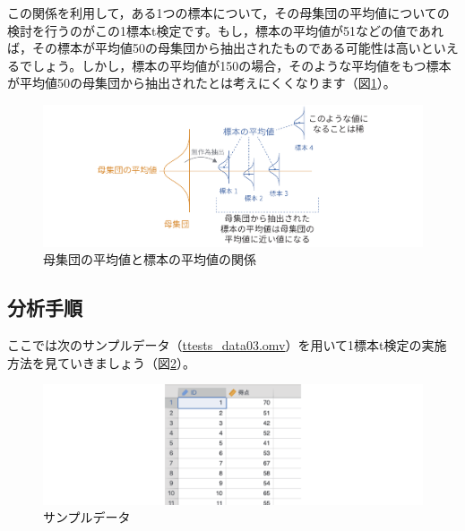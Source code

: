 \documentclass[
  12pt,
  a5jpaper,
  lualatex, ja=standard]{bxjsbook}
\begin{document}
この関係を利用して，ある1つの標本について，その母集団の平均値についての検討を行うのがこの1標本t検定です。もし，標本の平均値が51などの値であれば，その標本が平均値50の母集団から抽出されたものである可能性は高いといえるでしょう。しかし，標本の平均値が150の場合，そのような平均値をもつ標本が平均値50の母集団から抽出されたとは考えにくくなります（図\ref{fig:ttests-one-sample-basic}）。

\begin{figure}[!ht]

{\centering \includegraphics[width=1\linewidth]{images/ttests/one-sample-basic} 

}

\caption{母集団の平均値と標本の平均値の関係}\label{fig:ttests-one-sample-basic}
\end{figure}

\hypertarget{subsec:ttests-one-analysis}{%
\subsection{分析手順}\label{subsec:ttests-one-analysis}}

ここでは次のサンプルデータ（\href{https://github.com/sbtseiji/jmv_compguide/raw/main/data/omv/ttests_data03.omv}{ttests\_data03.omv}）を用いて1標本t検定の実施方法を見ていきましょう（図\ref{fig:ttests-data03}）。

\begin{figure}[!ht]

{\centering \includegraphics[width=1\linewidth]{images/ttests/data03} 

}

\caption{サンプルデータ}\label{fig:ttests-data03}
\end{figure}
\end{document}
